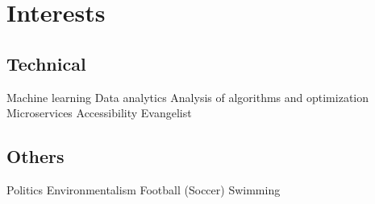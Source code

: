 \documentclass[]{deedy-resume-openfont}
\begin{document}
\begin{minipage}[t]{0.33\textwidth}


\section{Interests}
\subsection{Technical}
Machine learning \textbullet{} Data analytics \textbullet{} Analysis of algorithms and optimization \textbullet{} Microservices
\textbullet{} Accessibility Evangelist

\subsection{Others}
Politics \textbullet{} Environmentalism \textbullet{} Football (Soccer) \textbullet{} Swimming
\sectionsep



%
%

\end{minipage} 
\hfill
\end{document}
